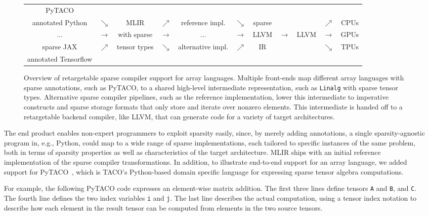 \documentclass[10pt]{article}
\begin{document}
\begin{figure}[bh]
\centering
\scriptsize
\begin{tabular}{cc|c|ccc|c|cccc}
PyTACO \\
\cline{3-3}\cline{7-7}
annotated Python & $\searrow$    & MLIR         & $\nearrow$    & reference impl.   & $\searrow$    & sparse &               &      &  $\nearrow$    & CPUs \\
$\dots$          & $\rightarrow$ & with sparse  & $\rightarrow$ & $\dots$           & $\rightarrow$ & LLVM   & $\rightarrow$ & LLVM &  $\rightarrow$ & GPUs \\
sparse JAX       & $\nearrow$    & tensor types & $\searrow$    & alternative impl. & $\nearrow$    & IR     &               &      &  $\searrow$    & TPUs \\
\cline{3-3}\cline{7-7}
annotated Tensorflow \\
\end{tabular}
\caption{
Overview of retargetable sparse compiler support for array languages. Multiple front-ends map different array languages with sparse annotations, such as PyTACO, to a shared high-level intermediate representation, such as \texttt{Linalg} with sparse tensor types. Alternative sparse compiler pipelines, such as the reference implementation, lower this intermediate to imperative constructs and sparse storage formats that only store and iterate over nonzero elements. This intermediate is handed off to a retargetable backend compiler, like LLVM, that can generate code for a variety of target architectures.
}
\label{fig:end2end}
\end{figure}

The end product enables non-expert programmers to exploit sparsity easily, since, by merely adding annotations, a single sparsity-agnostic program in, e.g., Python, could map to a wide range of sparse implementations, each tailored to specific instances of the same problem, both in terms of sparsity properties as well as characteristics of the target architecture. MLIR ships with an initial reference implementation of the sparse compiler transformations. In addition, to illustrate end-to-end support for an array language, we added support for PyTACO~\cite{taco}, which is TACO's Python-based domain specific language for expressing sparse tensor algebra computations.

For example, the following PyTACO code expresses an element-wise matrix addition. The first three lines define tensors \texttt{A} and \texttt{B}, and \texttt{C}. The fourth line defines the two index variables \texttt{i} and \texttt{j}. The last line describes the actual computation, using a tensor index notation to describe how each element in the result tensor can be computed from elements in the two source tensors.
\end{document}

